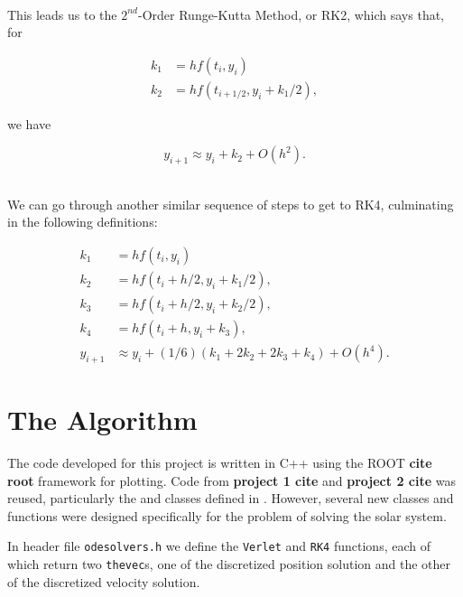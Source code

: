 \documentclass[12pt]{article}
\numberwithin{equation}{section}
\begin{document}
\\\indent This leads us to the $2^{nd}$-Order Runge-Kutta Method, or RK2, which says that, for

\begin{equation}
\label{eq:rk2part1}
\begin{align}
k_{1} & = hf\left(t_{i},y_{i}\right) \\
k_{2} & = hf\left(t_{i+1/2},y_{i}+k_{1}/2\right),
\end{align}
\end{equation}

\noindent we have

\begin{equation}
\label{eq:re2part2}
y_{i+1} \approx y_{i}+k_{2}+O\left(h^{2}\right).
\end{equation}

\\\indent We can go through another similar sequence of steps to get to RK4, culminating in the following definitions:

\begin{equation}
\label{eq:rk4}
\begin{align}
k_{1} & = hf\left(t_{i},y_{i}\right) \\
k_{2} & = hf\left(t_{i}+h/2,y_{i}+k_{1}/2\right), \\
k_{3} & = hf\left(t_{i}+h/2,y_{i}+k_{2}/2\right), \\
k_{4} & = hf\left(t_{i}+h,y_{i}+k_{3}\right), \\
y_{i+1} & \approx y_{i}+\left(1/6\right)\left(k_{1}+2k_{2}+2k_{3}+k_{4}\right)+O\left(h^{4}\right).
\end{align}
\end{equation}

\section{The Algorithm}
\label{sec:algorithm}

The code developed for this project is written in C++ using the ROOT \textbf{cite root} framework for plotting.  Code from \textbf{project 1 cite} and \textbf{project 2 cite} was reused, particularly the  and  classes defined in .  However, several new classes and functions were designed specifically for the problem of solving the solar system.
\par In header file \texttt{odesolvers.h} we define the \texttt{Verlet} and \texttt{RK4} functions, each of which return two \texttt{thevec}s, one of the discretized position solution and the other of the discretized velocity solution.  
\end{document}

